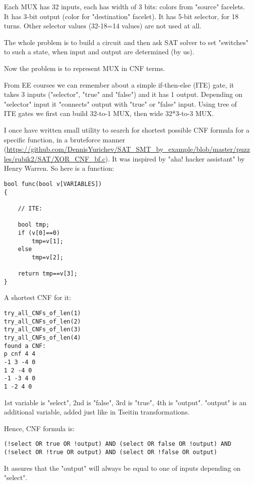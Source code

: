 Each MUX has 32 inputs, each has width of 3 bits: colors from "source" facelets.
It has 3-bit output (color for "destination" facelet).
It has 5-bit selector, for 18 turns. Other selector values (32-18=14 values) are not used at all.

The whole problem is to build a circuit and then ask SAT solver to set "switches" to such a state,
when input and output are determined (by us).

Now the problem is to represent MUX in CNF terms.

From \ac{EE} courses we can remember about a simple if-then-else (ITE) gate, it takes 3 inputs
("selector", "true" and "false") and it has 1 output.
Depending on "selector" input it "connects" output with "true" or "false" input.
Using tree of ITE gates we first can build 32-to-1 MUX, then wide 32*3-to-3 MUX.

I once have written small utility to search for shortest possible CNF formula for a specific function,
in a bruteforce manner (\url{https://github.com/DennisYurichev/SAT_SMT_by_example/blob/master/puzzles/rubik2/SAT/XOR_CNF_bf.c}).
It was inspired by "aha! hacker assistant" by Henry Warren.
So here is a function:

\begin{lstlisting}
bool func(bool v[VARIABLES])
{

	// ITE:

	bool tmp;
	if (v[0]==0)
		tmp=v[1];
	else
		tmp=v[2];

	return tmp==v[3];
}
\end{lstlisting}

A shortest CNF for it:

\begin{lstlisting}
try_all_CNFs_of_len(1)
try_all_CNFs_of_len(2)
try_all_CNFs_of_len(3)
try_all_CNFs_of_len(4)
found a CNF:
p cnf 4 4
-1 3 -4 0
1 2 -4 0
-1 -3 4 0
1 -2 4 0
\end{lstlisting}

1st variable is "select", 2nd is "false", 3rd is "true", 4th is "output".
"output" is an additional variable, added just like in Tseitin transformations.

Hence, CNF formula is:

\begin{lstlisting}
(!select OR true OR !output) AND (select OR false OR !output) AND (!select OR !true OR output) AND (select OR !false OR output)
\end{lstlisting}

It assures that the "output" will always be equal to one of inputs depending on "select".

